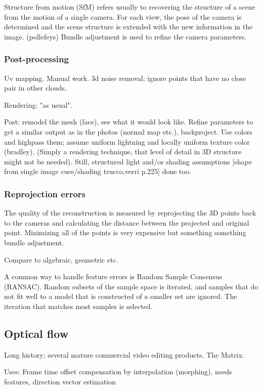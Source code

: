 Structure from motion (SfM) refers usually to recovering the structure of a scene from the motion of a single camera.
For each view, the pose of the camera is determined and the scene structure is extended with the new information in the image.
(pollefeys)
Bundle adjustment is used to refine the camera parameters.

\subsubsection{Post-processing}

Uv mapping. Manual work. 3d noise removal; ignore points that have no close pair in other clouds.

Rendering: "as usual".

Post: remodel the mesh (face), see what it would look like. Refine parameters to get a similar output as in the photos (normal map etc.), backproject. Use colors and highpass them; assume uniform lightning and locally uniform texture color (bradley). (Simply a rendering technique, that level of detail in 3D structure might not be needed). Still, structured light and/or shading assumptions [shape from single image cues/shading trucco,verri p.225] done too.


\subsubsection{Reprojection errors}

The quality of the reconstruction is measured by reprojecting the 3D points back to the cameras and calculating the distance between the projected and original point.
Minimizing all of the points is very expensive but something something bundle adjustment.

Compare to algebraic, geometric etc.

A common way to handle feature errors is Random Sample Consensus (RANSAC). Random subsets of the sample space is iterated, and samples that do not fit well to a model that is constructed of a smaller set are ignored. The iteration that matches most samples is selected.

\subsection{Optical flow}

Long history; several mature commercial video editing products. The Matrix.

Uses: Frame time offset compensation by interpolation (morphing), needs features, direction vector estimation

